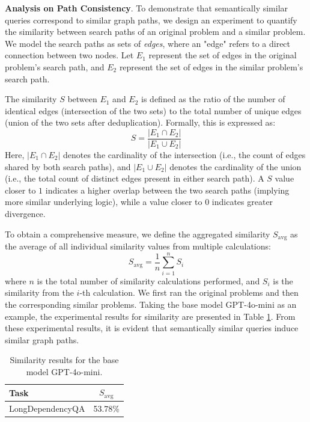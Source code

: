 \textbf{Analysis on Path Consistency}. To demonstrate that semantically similar queries correspond to similar graph paths, we design an experiment to quantify the similarity between search paths of an original problem and a similar problem. We model the search paths as sets of \textit{edges}, where an "edge" refers to a direct connection between two nodes. Let \( E_1 \) represent the set of edges in the original problem's search path, and \( E_2 \) represent the set of edges in the similar problem's search path.

The similarity \( S \) between \( E_1 \) and \( E_2 \) is defined as the ratio of the number of identical edges (intersection of the two sets) to the total number of unique edges (union of the two sets after deduplication). Formally, this is expressed as:
\[
S = \frac{|E_1 \cap E_2|}{|E_1 \cup E_2|}
\]
Here, \( |E_1 \cap E_2| \) denotes the cardinality of the intersection (i.e., the count of edges shared by both search paths), and \( |E_1 \cup E_2| \) denotes the cardinality of the union (i.e., the total count of distinct edges present in either search path). A \( S \) value closer to \( 1 \) indicates a higher overlap between the two search paths (implying more similar underlying logic), while a value closer to \( 0 \) indicates greater divergence.

To obtain a comprehensive measure, we define the aggregated similarity \( S_{\text{avg}} \) as the average of all individual similarity values from multiple calculations:
\[S_{\text{avg}} = \frac{1}{n} \sum_{i=1}^{n} S_i\]
where \( n \) is the total number of similarity calculations performed, and \( S_i \) is the similarity from the \( i \)-th calculation. We first ran the original problems and then the corresponding similar problems. Taking the base model GPT-4o-mini as an example, the experimental results for similarity are presented in Table \ref{tab:similarity-result}. From these experimental results, it is evident that semantically similar queries induce similar graph paths.

\begin{table}[ht]
\captionsetup{skip=10pt} 
\centering
\begin{tabular}{l|c}
\toprule
Task               & \( S_{\text{avg}} \) \\
\midrule
LongDependencyQA   & 53.78\% \\
\bottomrule
\end{tabular}
\caption{Similarity results for the base model GPT-4o-mini.}
\label{tab:similarity-result}
\end{table}




